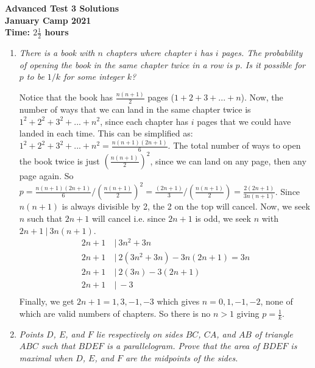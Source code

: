 \documentclass{article}
\begin{document}
\thispagestyle{empty}

\begin{center}
  \textbf{\Large Advanced Test 3 Solutions}
  \\ \vspace{1em}
  \textbf{\large January Camp 2021}
  \\ \vspace{1em}
  \textbf{\large Time: $2\frac{1}{2}$ hours}
\end{center}

\vspace{12pt}

\begin{enumerate}[1.]

\item %
{\itshape There is a book with $n$ chapters where chapter $i$ has $i$ pages.
The probability of opening the book in the same chapter twice in a row is $p$.
Is it possible for $p$ to be $1/k$ for some integer $k$?}

Notice that the book has $\frac{n(n+1)}{2}$ pages ($1+2+3+...+n$). Now, the number of ways that we can land in the same chapter twice is $1^2+2^2+3^2+...+n^2$, since each chapter has $i$ pages that we could have landed in each time. This can be simplified as: $1^2+2^2+3^2+...+n^2 = \frac{n(n+1)(2n+1)}{6}$. The total number of ways to open the book twice is just $(\frac{n(n+1)}{2})^2$, since we can land on any page, then any page again. So $p = \frac{n(n+1)(2n+1)}{6}/(\frac{n(n+1)}{2})^2 = \frac{(2n+1)}{3}/(\frac{n(n+1)}{2})=\frac{2(2n+1)}{3n(n+1)}$. Since $n(n+1)$ is always divisible by 2, the 2 on the top will cancel. Now, we seek $n$ such that $2n+1$ will cancel i.e. since $2n+1$ is odd, we seek $n$ with $2n+1\:|\: 3n(n+1)$.
\begin{align*}
2n+1\:&|\: 3n^2+3n\\
2n+1\:&|\: 2(3n^2+3n)-3n(2n+1) = 3n\\
2n+1\:&|\: 2(3n)-3(2n+1)\\
2n+1\:&|\: -3\\
\end{align*}
Finally, we get $2n+1=1,3,-1,-3$ which gives $n=0,1,-1,-2$, none of which are valid numbers of chapters. So there is no $n>1$ giving $p=\frac{1}{k}$.


\item %
{\itshape Points $D$, $E$, and $F$ lie respectively on sides $BC$, $CA$, and $AB$ of triangle $ABC$ such that $BDEF$ is a parallelogram. Prove that the area of $BDEF$ is maximal when $D$, $E$, and $F$ are the midpoints of the sides.}



\end{enumerate}
\end{document}
